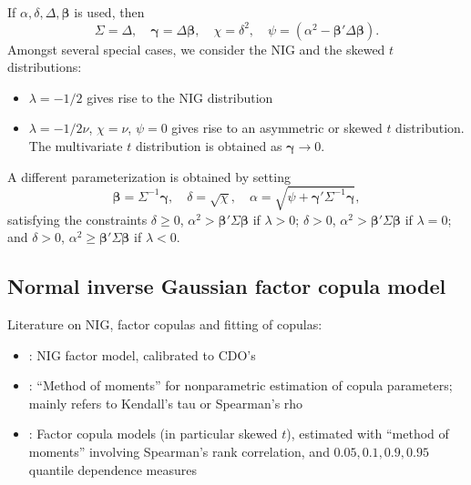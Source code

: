 \begin{definition}
If $\alpha, \delta, \Delta, \mathbf\beta$ is used, then
\begin{equation*}
  \Sigma = \Delta, \quad \mathbf\gamma = \Delta\mathbf \beta, \quad
  \chi = \delta^2, \quad \psi = (\alpha^2 - \mathbf\beta' \Delta
  \mathbf\beta). 
\end{equation*}
Amongst several special cases, we consider the NIG and the skewed $t$
distributions:
\begin{itemize}
\item $\lambda=-1/2$ gives rise to the NIG distribution
\item $\lambda=-1/2 \nu$, $\chi=\nu$, $\psi=0$ gives rise to an
  asymmetric or skewed $t$ distribution. The multivariate $t$
  distribution is obtained as $\mathbf \gamma\rightarrow 0$. 
\end{itemize}


A different parameterization is obtained by setting
\begin{equation*}
  \mathbf \beta = \Sigma^{-1}\mathbf \gamma, \quad \delta=\sqrt\chi,
  \quad \alpha = \sqrt{\psi + \mathbf \gamma' \Sigma^{-1} \mathbf
    \gamma}, 
\end{equation*}
satisfying the constraints $\delta\geq0$, $\alpha^2 > \mathbf \beta'
\Sigma\mathbf\beta$ if $\lambda>0$; $\delta>0$, $\alpha^2>
\mathbf\beta' \Sigma\mathbf \beta$ if $\lambda=0$; and $\delta>0$,
$\alpha^2\geq \mathbf\beta' \Sigma \mathbf \beta$ if $\lambda<0$. 



\end{definition}


\subsection{Normal inverse Gaussian factor copula model}
\label{sec:norm-inverse-gauss-1}

Literature on NIG, factor copulas and fitting of copulas:
\begin{itemize}
\item \citep{Kalemanova2007}: NIG factor model, calibrated to CDO's
\item \citep{Genest1987,Genest1993}: ``Method of moments'' for
  nonparametric estimation of copula parameters; mainly refers to
  Kendall's tau or Spearman's rho
\item \citep{Patton2012,Oh2013}: Factor copula models (in particular
  skewed $t$), estimated with ``method of moments'' involving
  Spearman's rank correlation, and $0.05, 0.1, 0.9, 0.95$ quantile
  dependence measures
\end{itemize}


